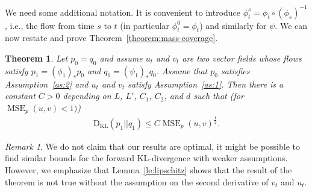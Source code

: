 \documentclass{article}
\newtheorem{theorem}{Theorem}
\theoremstyle{remark}
\newtheorem{remark}{Remark}
\newcommand{\KL}{\mathrm{D_{KL}}}
\DeclareMathOperator{\MSE}{MSE}
\begin{document}
We need some additional notation.
It is convenient to 
 introduce  $\phi^s_t = \phi_t \circ (\phi_s)^{-1}$, i.e., the flow from time $s$ to $t$ (in particular $\phi^0_t=\phi_t$) and similarly for $\psi$. 
We can now restate and prove Theorem~\ref{theorem:mass-coverage}.
\begin{theorem}
Let $p_0=q_0$ and assume $u_t$ and $v_t$ are two vector fields whose flows satisfy $p_1=(\phi_1)_\ast p_0$
and $q_1=(\psi_1)_\ast q_0$. Assume that $p_0$ satisfies
Assumption~\ref{as:2} and $u_t$ and $v_t$ satisfy
Assumption~\ref{as:1}. Then there is a constant $C>0$ depending on $L$, $L'$, $C_1$, $C_2$, and $d$ 
such that (for $\MSE_p(u,v)<1)$)
\begin{align}
    \KL(p_1||q_1)\leq C \MSE_p(u,v)^{\frac12}.
\end{align}

\end{theorem}
\begin{remark}
    We do not claim that our
    results are optimal, it might be possible to find similar bounds for the forward KL-divergence with weaker assumptions. However, we emphasize that Lemma~\ref{le:lipschitz} shows that the result of the theorem is not true without the assumption on the second derivative of $v_t$ and $u_t$.  
\end{remark}
\end{document}
